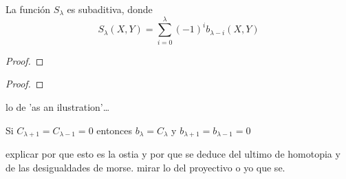 \bigskip

\begin{lemma}
    La función $S_{\lambda}$ es subaditiva, donde 
    \begin{equation*}
        S_{\lambda}(X,Y) = \sum_{i=0}^{\lambda} (-1)^i b_{\lambda-i}(X,Y)
    \end{equation*}
\end{lemma}
\begin{proof}

\end{proof}

\bigskip

\begin{theorem}

\end{theorem}
\begin{proof}
    
\end{proof}

lo de 'as an ilustration'\dots

\begin{corollary}
    Si $C_{\lambda+1} = C_{\lambda-1} = 0$ entonces $b_{\lambda} = C_{\lambda}$ y $b_{\lambda+1} = b_{\lambda-1} = 0$ 
\end{corollary}

explicar por que esto es la ostia y por que se deduce del ultimo de homotopia y de las desigualdades de morse. mirar lo del proyectivo o yo que se.